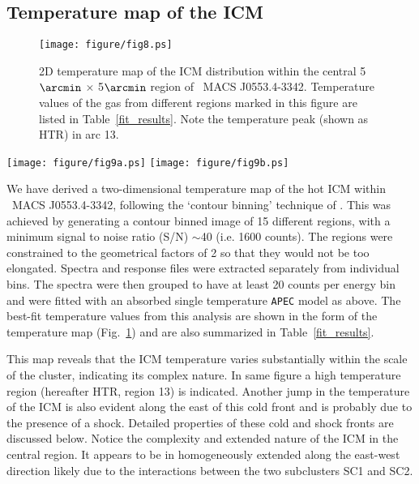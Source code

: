 \documentclass[useASM,usenatbib]{mn2e}
\newcommand{\mac}{\rm~MACS J0553.4-3342}
\begin{document}
\subsection{Temperature map of the ICM}
\label{ICMT}
\begin{figure}
\center
\texttt{[image: figure/fig8.ps]}
\caption{2D temperature map of the ICM distribution within the central
  5$\arcmin$ $\times$ 5$\arcmin$ region of \mac.  Temperature values
  of the gas from different regions marked in this figure are listed
  in Table~\ref{fit_results}. Note the temperature peak (shown as
  HTR) in arc 13.}
\label{fig4}
\end{figure}
\begin{figure*}
\texttt{[image: figure/fig9a.ps]}
\texttt{[image: figure/fig9b.ps]}
\caption{Profiles of the thermodynamical parameters temperature (kT),
  electron density ($n_{e}$), pressure (P) and entropy (S)
  (respectively from top to bottom) for the extracted spectra from
  regions 1, 2, 3, 4, and 5 are shown in the {\it left panel}, while
  those for regions a, b and c are shown in {\it right panel}.}
\label{fig6}
\end{figure*}
We have derived a two-dimensional temperature map of the hot ICM
within \mac, following the `contour binning' technique of
\cite{2006MNRAS.371..829S}. This was achieved by generating a contour
binned image of 15 different regions, with a minimum signal to noise
ratio (S/N) $\sim$40 (i.e. 1600 counts). The regions were constrained
to the geometrical factors of 2 so that they would not be too
elongated. Spectra and response files were extracted
separately from individual bins. The spectra were then grouped to have
at least 20 counts per energy bin and were fitted with an absorbed
single temperature {\tt APEC} model as above. The best-fit temperature
values from this analysis are shown in the form of the temperature map
(Fig.~\ref{fig4}) and are also summarized in
Table~\ref{fit_results}.

This map reveals that the ICM temperature varies substantially within
the scale of the cluster, indicating its complex nature. In same figure a high temperature region (hereafter HTR, region 13) is indicated.  Another jump in the temperature of the ICM is also evident along the east of this cold front and is probably due to the presence
of a shock. Detailed properties of these cold and shock fronts are
discussed below. Notice the complexity and extended nature of the ICM
in the central region. It appears to be in homogeneously extended along the east-west direction likely due to the interactions between the two subclusters SC1 and SC2.
\end{document}
